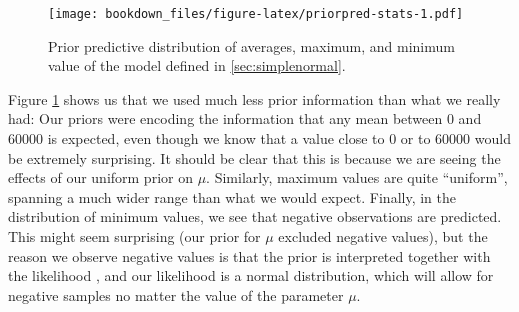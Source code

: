 \documentclass[12pt,]{krantz}
\newenvironment{Shaded}{\begin{snugshade}}{\end{snugshade}}
\newcommand{\KeywordTok}[1]{\textcolor[rgb]{0.13,0.29,0.53}{\textbf{#1}}}
\newcommand{\DataTypeTok}[1]{\textcolor[rgb]{0.13,0.29,0.53}{#1}}
\newcommand{\DecValTok}[1]{\textcolor[rgb]{0.00,0.00,0.81}{#1}}
\newcommand{\StringTok}[1]{\textcolor[rgb]{0.31,0.60,0.02}{#1}}
\newcommand{\CommentTok}[1]{\textcolor[rgb]{0.56,0.35,0.01}{\textit{#1}}}
\newcommand{\OperatorTok}[1]{\textcolor[rgb]{0.81,0.36,0.00}{\textbf{#1}}}
\newcommand{\NormalTok}[1]{#1}
\theoremstyle{definition}
\theoremstyle{definition}
\theoremstyle{definition}
\theoremstyle{remark}
\begin{document}
\begin{Shaded}
\end{Shaded}

\begin{figure}
\centering
\texttt{[image: bookdown\_files/figure-latex/priorpred-stats-1.pdf]}
\caption{\label{fig:priorpred-stats}Prior predictive distribution of averages,
maximum, and minimum value of the model defined in
\ref{sec:simplenormal}.}
\end{figure}

Figure \ref{fig:priorpred-stats} shows us that we used much less prior
information than what we really had: Our priors were encoding the
information that any mean between 0 and 60000 is expected, even though
we know that a value close to 0 or to 60000 would be extremely
surprising. It should be clear that this is because we are seeing the
effects of our uniform prior on \(\mu\). Similarly, maximum values are
quite ``uniform'', spanning a much wider range than what we would
expect. Finally, in the distribution of minimum values, we see that
negative observations are predicted. This might seem surprising (our
prior for \(\mu\) excluded negative values), but the reason we observe
negative values is that the prior is interpreted together with the
likelihood \citep{gelmanPriorCanOften2017}, and our likelihood is a
normal distribution, which will allow for negative samples no matter the
value of the parameter \(\mu\).
\end{document}
